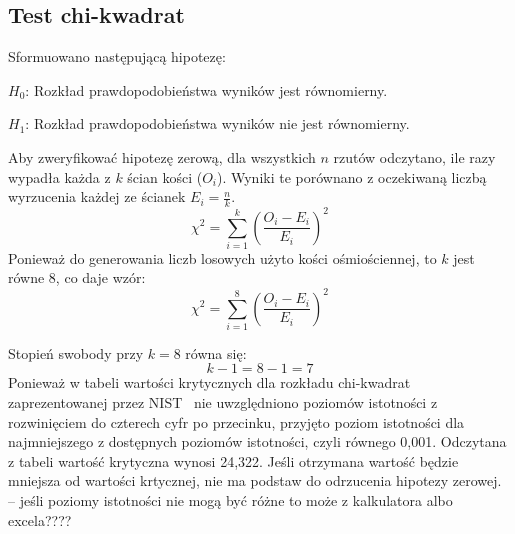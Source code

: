 \subsection{Test chi-kwadrat}
Sformuowano następującą hipotezę:
\par \begin{math} H_0 \end{math}: Rozkład prawdopodobieństwa wyników jest równomierny.
\par \begin{math} H_1 \end{math}: Rozkład prawdopodobieństwa wyników nie jest równomierny.
\par Aby zweryfikować hipotezę zerową, dla wszystkich \begin{math} n \end{math} rzutów odczytano, ile razy wypadła każda z 
\begin{math} k \end{math} ścian kości (\begin{math}O_i\end{math}). Wyniki te porównano z oczekiwaną
liczbą wyrzucenia każdej ze ścianek \begin{math}E_i = \frac{n}{k}\end{math}. 
\begin{displaymath}
    \chi^2 = \sum_{i=1}^{k} \left( \frac{O_i - E_i}{E_i} \right)^2
\end{displaymath}
Ponieważ do generowania liczb losowych użyto kości ośmiościennej, to \begin{math} k \end{math} jest równe 8, co daje wzór:
\begin{displaymath}
    \chi^2 = \sum^{8}_{i=1} \left( \frac{O_i - E_i}{E_i} \right)^2
\end{displaymath}
\par Stopień swobody przy \begin{math} k = 8 \end{math} równa się:
\begin{displaymath}
    k - 1 = 8 - 1 = 7
\end{displaymath}
Ponieważ w tabeli wartości krytycznych dla rozkładu chi-kwadrat zaprezentowanej przez NIST~\cite{NIST2012} nie
uwzględniono poziomów istotności z rozwinięciem do czterech cyfr po przecinku, przyjęto poziom istotności dla 
najmniejszego z dostępnych poziomów istotności, czyli równego 0{,}001. Odczytana z tabeli wartość krytyczna wynosi
24{,}322. Jeśli otrzymana wartość będzie mniejsza od wartości krtycznej, nie ma podstaw do odrzucenia 
hipotezy zerowej.
\\-- jeśli poziomy istotności nie mogą być różne to może z kalkulatora albo excela???? 


